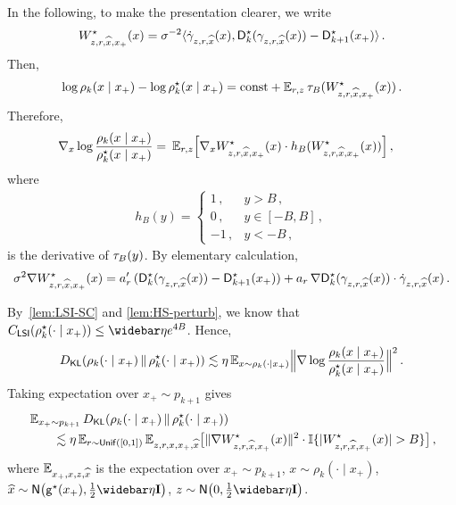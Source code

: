In the following, to make the presentation clearer, we write
\begin{align*}
    \Wstar_{z,r,\xhat,x_+}(x)=\sigma^{-2}\tri{\dot\gamma_{z,r,\xhat}(x),\Ds_k(\gamma_{z,r,\xhat}(x))-\Ds_{k+1}(x_+)}\,.
\end{align*}
Then,
\begin{align*}
    \log \rho_k(x\mid x_+)-\log \rhostar_k(x\mid x_+)=\const+\En_{\lr,z}\trunc[\B]{\Wstar_{z,r,\xhat,x_+}(x)}\,.
\end{align*}
Therefore,
\begin{align*}
    \nabla_x \log \frac{\rho_k(x\mid x_+)}{\rhostar_k(x\mid x_+)}
    =&~ \En_{\lr,z}\brk*{ \nabla_x \Wstar_{z,r,\xhat,x_+}(x) \cdot h_B(\Wstar_{z,r,\xhat,x_+}(x))}\,, 
\end{align*}
where
\begin{align*}
h_B(y)=\begin{cases}
    1\,, & y>B\,,\\
    0\,, &y\in[-B,B]\,,\\
    -1\,, &y<-B\,,
\end{cases}
\end{align*}
is the derivative of $\trunc{y}$.
By elementary calculation,
\begin{align*}
    \sigma^2 \nabla \Wstar_{z,r,\xhat,x_+}(x)=\alrp\, (\Ds_k(\gamma_{z,r,\xhat}(x))-\Ds_{k+1}(x_+))+\alr\, \nabla \Ds_k(\gamma_{z,r,\xhat}(x)) \cdot \dot\gamma_{z,r,\xhat}(x)\,.
\end{align*}

By~\cref{lem:LSI-SC} and \cref{lem:HS-perturb}, we know that
$\CLSI(\rhostar_k(\cdot\mid x_+))\leq \etabar e^{4B}$. Hence,
\begin{align*}
    \Dkl{\rho_k(\cdot\mid x_+)}{\rhostar_k(\cdot\mid x_+)}\leqsim \eta\En_{x\sim \rho_k(\cdot\mid x_+)} \nrm[\Big]{\nabla \log \frac{\rho_k(x\mid x_+)}{\rhostar_k(x\mid x_+)}}^2\,.
\end{align*}
Taking expectation over $x_+ \sim p_{k+1}$ gives
\begin{align*}
    &\En_{x_+ \sim p_{k+1}} \Dkl{\rho_k(\cdot\mid x_+)}{\rhostar_k(\cdot\mid x_+)} \\
    &\qquad \leqsim \eta \En_{r\sim \unif([0,1])}\En_{z,r,x,x_+,\xhat}\brk[\big]{ \nrm{\nabla \Wstar_{z,r,\xhat,x_+}(x)}^2 \cdot \indic\crl{\abs{\Wstar_{z,r,\xhat,x_+}(x)}>\B} }\,, 
\end{align*}
where $\En_{x_+,x,z,\xhat}$ is the expectation over $x_+\sim p_{k+1}$, $x\sim \rho_k(\cdot\mid x_+)$, $\xhat\sim \normal{\gds(x_+),\frac12\etabar\Id}$, $z\sim \normal{0,\frac12\etabar\Id}$.

